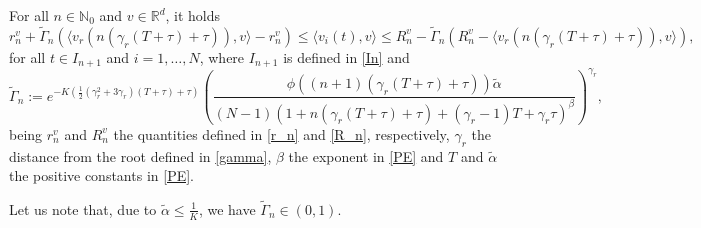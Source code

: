 \documentclass[11pt]{article}
\begin{document}
	\begin{prop}\label{lemma3'cs}
		For all $n\in \mathbb{N}_0$ and $v\in \mathbb{R}^d$, it holds
		\begin{equation} \label{B'cs}
			r^v_{n}+\tilde\Gamma_{n}(\langle v_r(n(\gamma_r(T+\tau)+\tau)),v\rangle-r^v_{n}) \leq \langle v_i(t),v\rangle\leq R^v_{n}-\tilde\Gamma_{n}(R^v_{n}-\langle v_r(n(\gamma_r(T+\tau)+\tau)),v\rangle), 
		\end{equation}
		for all $t\in I_{n+1}$ and $i =1,\dots, N$, where $I_{n+1}$ is defined in \eqref{In} and		
		\begin{equation}\label{Gammancs}
			\tilde\Gamma_{n}:=e^{-K (\frac{1}{2}(\gamma_r^2+3\gamma_r)(T+\tau)+\tau)}\left(\frac{\phi((n+1)(\gamma_r(T+\tau)+\tau))\tilde{\alpha}}{(N-1)(1+n(\gamma_r(T+\tau)+\tau)+(\gamma_r-1)T+\gamma_r\tau)^\beta}\right)^{\gamma_r},
		\end{equation}
		being $r_n^v$ and $R_n^v$ the quantities defined in \eqref{r_n} and \eqref{R_n}, respectively, $\gamma_r$ the distance from the root defined in \eqref{gamma}, $\beta$ the exponent in \eqref{PE} and $T$ and $\tilde{\alpha}$ the positive constants in \eqref{PE}.		
	\end{prop}
	\begin{oss}
		Let us note that, due to $\tilde{\alpha}\leq \frac{1}{K}$, we have $\tilde{\Gamma}_n\in (0,1)$.
	\end{oss}
\end{document}
